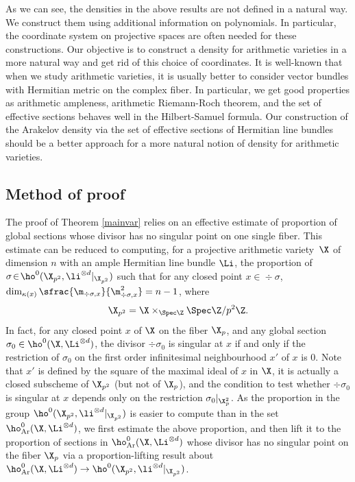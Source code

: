 As we can see, the densities in the above results are not defined in a natural way. We construct them using additional information on polynomials. In particular, the coordinate system on projective spaces are often needed for these constructions. Our objective is to construct a density for arithmetic varieties in a more natural way and get rid of this choice of coordinates. It is well-known that when we study arithmetic varieties, it is usually better to consider vector bundles with Hermitian metric on the complex fiber. In particular, we get good properties as arithmetic ampleness, arithmetic Riemann-Roch theorem, and the set of effective sections behaves well in the Hilbert-Samuel formula. Our construction of the Arakelov density via the set of effective sections of Hermitian line bundles should be a better approach for a more natural notion of density for arithmetic varieties.

\subsection{Method of proof}
The proof of Theorem \ref{mainvar} relies on an effective \hbox{estimate} of proportion of global sections whose divisor has no singular point on one \hbox{single} fiber. This estimate can be reduced to computing, for a projective arithmetic variety~$\X$ of dimension $n$ with an ample Hermitian line bundle $\Li$, the proportion of $\sigma\!\in\! \ho^0(\X_{p^2}, \li^{\otimes d}|_{\X_{p^2}})$ such that for any closed point $x\!\in\!\div \sigma$, $\dim_{\kappa(x)}\sfrac{\m_{\div \sigma,x}}{\m^2_{\div \sigma, x}}=n-1$, where
\[
\X_{p^2}=\X\times_{\Spec \Z}\Spec \Z/p^2\Z.
\]
In fact, for any closed point $x$ of $\X$ on the fiber $\X_p$, and any global section $\sigma_0\in \ho^0(\X, \Li^{\otimes d})$, the divisor $\div \sigma_0$ is singular at $x$ if and only if the restriction of $\sigma_0$ on the first order infinitesimal neighbourhood $x'$ of $x$ is $0$. Note that $x'$ is defined by the square of the maximal ideal of $x$ in $\X$, it is actually a closed subscheme of $\X_{p^2}$ (but not of $\X_p$), and the condition to test whether $\div \sigma_0$ is singular at $x$ depends only on the restriction $\sigma_0|_{\X_p^2}$. As the proportion in the group $\ho^0(\X_{p^2}, \li^{\otimes d}|_{\X_{p^2}})$ is easier to compute than in the set $\ho^0_{\mathrm{Ar}}(\X, \Li^{\otimes d})$, we first estimate the above proportion, and then lift it to the proportion of sections in $\ho^0_{\mathrm{Ar}}(\X, \Li^{\otimes d})$ whose divisor has no singular point on the fiber $\X_p$ via a proportion-lifting result about $\ho^0_{\mathrm{Ar}}(\X, \Li^{\otimes d})\to \ho^0(\X_{p^2}, \li^{\otimes d}|_{\X_{p^2}})$.

